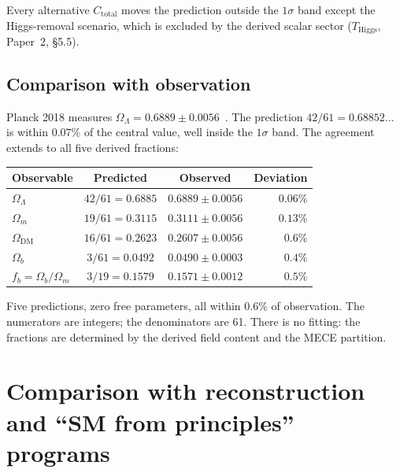 \documentclass[11pt,a4paper]{article}
\theoremstyle{definition}
\begin{document}
\smallskip\noindent Every alternative $C_{\mathrm{total}}$ moves the
prediction outside the $1\sigma$ band except the Higgs-removal scenario,
which is excluded by the derived scalar sector ($T_{\mathrm{Higgs}}$,
Paper~2, \S5.5).

\subsection{Comparison with observation}

Planck 2018 measures
$\Omega_\Lambda = 0.6889 \pm 0.0056$~\cite{Planck2020}.
The prediction $42/61 = 0.68852\ldots$ is within $0.07\%$ of the
central value, well inside the $1\sigma$ band.  The agreement extends
to all five derived fractions:

\smallskip
\begin{center}
\small
\begin{tabular}{@{}lccr@{}}
\toprule
\textbf{Observable} & \textbf{Predicted} & \textbf{Observed} & \textbf{Deviation} \\
\midrule
$\Omega_\Lambda$ & $42/61 = 0.6885$ & $0.6889 \pm 0.0056$ & $0.06\%$ \\
$\Omega_m$ & $19/61 = 0.3115$ & $0.3111 \pm 0.0056$ & $0.13\%$ \\
$\Omega_{\mathrm{DM}}$ & $16/61 = 0.2623$ & $0.2607 \pm 0.0056$ & $0.6\%$ \\
$\Omega_b$ & $3/61 = 0.0492$ & $0.0490 \pm 0.0003$ & $0.4\%$ \\
$f_b = \Omega_b/\Omega_m$ & $3/19 = 0.1579$ & $0.1571 \pm 0.0012$ & $0.5\%$ \\
\bottomrule
\end{tabular}
\end{center}

\smallskip\noindent Five predictions, zero free parameters, all within
$0.6\%$ of observation.  The numerators are integers; the denominators
are 61.  There is no fitting: the fractions are determined by the
derived field content and the MECE partition.


\newpage


\appendix


\section{Comparison with reconstruction and ``SM from principles'' programs}
\label{app:literature}
\end{document}
